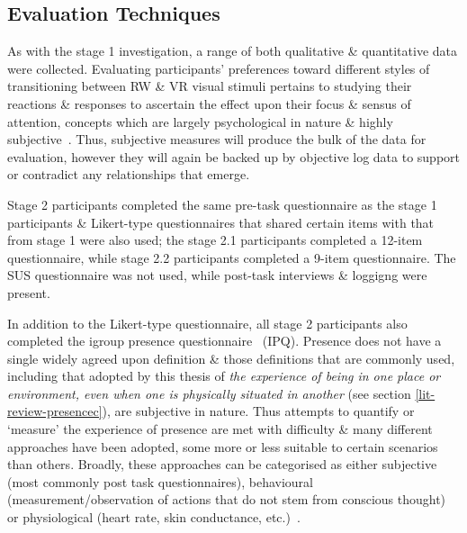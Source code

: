 
\subsection{Evaluation Techniques}

As with the stage 1 investigation, a range of both qualitative \& quantitative data were collected. Evaluating participants' preferences toward different styles of transitioning between RW \& VR visual stimuli pertains to studying their reactions \& responses to ascertain the effect upon their focus \& sensus of attention, concepts which are largely psychological in nature \& highly subjective~\cite{Ijsselsteijn2001}. Thus, subjective measures will produce the bulk of the data for evaluation, however they will again be backed up by objective log data to support or contradict any relationships that emerge.

Stage 2 participants completed the same pre-task questionnaire as the stage 1 participants \& Likert-type questionnaires that shared certain items with that from stage 1 were also used; the stage 2.1 participants completed a 12-item questionnaire, while stage 2.2 participants completed a 9-item questionnaire. The SUS questionnaire was not used, while post-task interviews \& loggigng were present.


In addition to the Likert-type questionnaire, all stage 2 participants also completed the igroup presence questionnaire~\cite{Schubert2001} (IPQ). Presence does not have a single widely agreed upon definition \& those definitions that are commonly used, including that adopted by this thesis of \textit{the experience of being in one place or environment, even when one is physically situated in another} (see section \ref{lit-review-presencec}), are subjective in nature. Thus attempts to quantify or `measure' the experience of presence are met with difficulty \& many different approaches have been adopted, some more or less suitable to certain scenarios than others. Broadly, these approaches can be categorised as either subjective (most commonly post task questionnaires), behavioural (measurement/observation of actions that do not stem from conscious thought) or physiological (heart rate, skin conductance, etc.)~\cite{Insko2003}.

